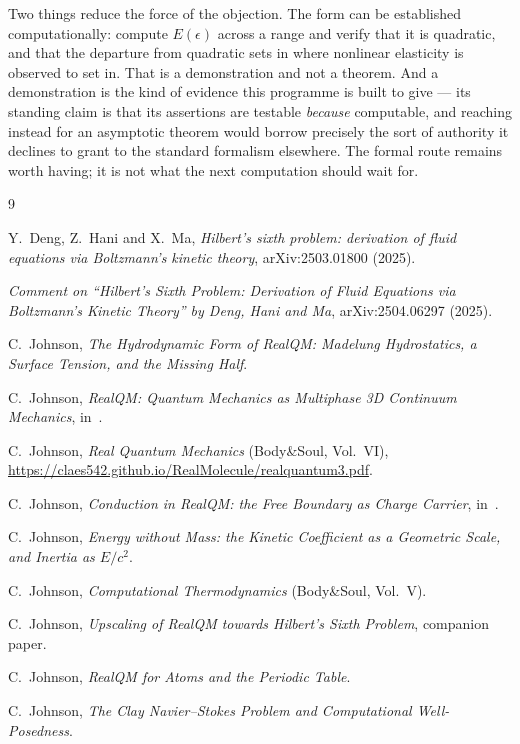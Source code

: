 \documentclass[11pt]{article}
\begin{document}
Two things reduce the force of the objection. The form can be established computationally: compute
$E(\epsilon)$ across a range and verify that it is quadratic, and that the departure from quadratic
sets in where nonlinear elasticity is observed to set in. That is a demonstration and not a theorem.
And a demonstration is the kind of evidence this programme is built to give --- its standing claim is
that its assertions are testable \emph{because} computable, and reaching instead for an asymptotic
theorem would borrow precisely the sort of authority it declines to grant to the standard formalism
elsewhere. The formal route remains worth having; it is not what the next computation should wait
for.

\begin{thebibliography}{9}

 Y.~Deng, Z.~Hani and X.~Ma, \emph{Hilbert's sixth problem: derivation of fluid
equations via Boltzmann's kinetic theory}, arXiv:2503.01800 (2025).

 \emph{Comment on ``Hilbert's Sixth Problem: Derivation of Fluid Equations via
Boltzmann's Kinetic Theory'' by Deng, Hani and Ma}, arXiv:2504.06297 (2025).

 C.~Johnson, \emph{The Hydrodynamic Form of RealQM: Madelung Hydrostatics, a
Surface Tension, and the Missing Half}.

 C.~Johnson, \emph{RealQM: Quantum Mechanics as Multiphase 3D Continuum Mechanics},
in~\cite{realqmbook}.

 C.~Johnson, \emph{Real Quantum Mechanics} (Body\&Soul, Vol.~VI),
\url{https://claes542.github.io/RealMolecule/realquantum3.pdf}.

 C.~Johnson, \emph{Conduction in RealQM: the Free Boundary as Charge Carrier},
in~\cite{realqmbook}.

 C.~Johnson, \emph{Energy without Mass: the Kinetic Coefficient as a Geometric
Scale, and Inertia as $E/c^2$}.

 C.~Johnson, \emph{Computational Thermodynamics} (Body\&Soul, Vol.~V).

 C.~Johnson, \emph{Upscaling of RealQM towards
Hilbert's Sixth Problem}, companion paper.

 C.~Johnson, \emph{RealQM for Atoms and the Periodic Table}.

 C.~Johnson, \emph{The Clay Navier--Stokes Problem and Computational
Well-Posedness}.

\end{thebibliography}
\end{document}
